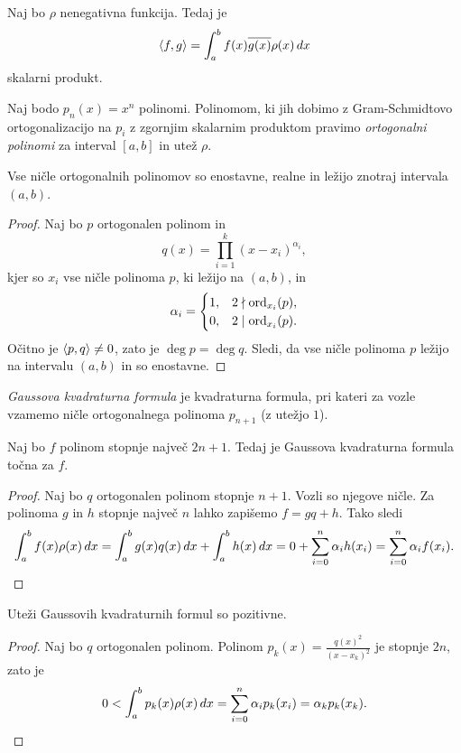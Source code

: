 \begin{trditev}
Naj bo $\rho$ nenegativna funkcija. Tedaj je
\[
\left\langle f, g\right\rangle = \int_a^b f(x) \overline{g(x)} \rho(x)\,dx
\]
skalarni produkt.
\end{trditev}

\obvs

\begin{definicija}
Naj bodo $p_n(x) = x^n$ polinomi. Polinomom, ki jih dobimo z
Gram-Schmidtovo ortogonalizacijo na $p_i$ z zgornjim skalarnim
produktom pravimo
\emph{ortogonalni polinomi} za interval
$[a, b]$ in utež $\rho$.
\end{definicija}

\begin{lema}
Vse ničle ortogonalnih polinomov so enostavne, realne in ležijo
znotraj intervala $(a,b)$.
\end{lema}

\begin{proof}
Naj bo $p$ ortogonalen polinom in
\[
q(x) = \prod_{i=1}^k (x - x_i)^{\alpha_i},
\]
kjer so $x_i$ vse ničle polinoma $p$, ki ležijo na $(a,b)$, in
\[
\alpha_i =
\begin{cases}
1, & 2 \nmid \operatorname{ord}_{x_i}(p), \\
0, & 2 \mid \operatorname{ord}_{x_i}(p).
\end{cases}
\]
Očitno je $\left\langle p, q\right\rangle \ne 0$, zato je $\deg p = \deg q$. Sledi,
da vse ničle polinoma $p$ ležijo na intervalu $(a, b)$ in so
enostavne.
\end{proof}

\begin{definicija}
\emph{Gaussova kvadraturna formula}
je kvadraturna formula, pri kateri za vozle vzamemo ničle
ortogonalnega polinoma $p_{n+1}$ (z utežjo $1$).
\end{definicija}

\begin{trditev}
Naj bo $f$ polinom stopnje največ $2n+1$. Tedaj je Gaussova
kvadraturna formula točna za $f$.
\end{trditev}

\begin{proof}
Naj bo $q$ ortogonalen polinom stopnje $n+1$. Vozli so njegove
ničle. Za polinoma $g$ in $h$ stopnje največ $n$ lahko zapišemo
$f = gq + h$. Tako sledi
\[
\int_a^b f(x) \rho(x)\,dx =
\int_a^b g(x) q(x)\,dx + \int_a^b h(x)\,dx =
0 + \sum_{i=0}^n \alpha_i h(x_i) =
\sum_{i=0}^n \alpha_i f(x_i). \qedhere
\]
\end{proof}

\begin{lema}
Uteži Gaussovih kvadraturnih formul so pozitivne.
\end{lema}

\begin{proof}
Naj bo $q$ ortogonalen polinom. Polinom
$p_k(x) = \frac{q(x)^2}{(x - x_k)^2}$ je stopnje $2n$, zato je
\[
0 < \int_a^b p_k(x) \rho(x)\,dx =
\sum_{i=0}^n \alpha_i p_k(x_i) =
\alpha_k p_k(x_k). \qedhere
\]
\end{proof}
